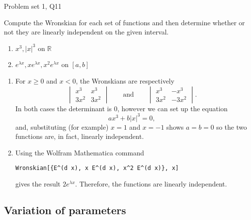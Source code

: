 \begin{problem}{Problem set 1, Q11}{}


    Compute the Wronskian for each set of functions and then determine whether or not they are linearly independent on the given interval.

    \begin{enumerate}
        \item $x^3, \lvert x \rvert^3$ on $\mathbb{R}$
        \item $e^{\lambda x}, xe^{\lambda x}, x^2 e^{\lambda x}$ on $[a, b]$
    \end{enumerate}

    \tcblower

    \begin{enumerate}
        \item For $x \geq 0$ and $x < 0$, the Wronskians are respectively
            $$ 
                \begin{vmatrix}
                    x^3 & x^3 \\
                    3x^2 & 3x^2
                \end{vmatrix}
                \qquad \text{and} \qquad
                \begin{vmatrix}
                    x^3 & -x^3 \\
                    3x^2 & -3x^2
                \end{vmatrix} .
            $$
        In both cases the determinant is $0$, however we can set up the equation
            $$ ax^3 + b \lvert x \rvert^3 = 0 , $$
        and, substituting (for example) $x = 1$ and $x = -1$ shows $a = b = 0$ so the two functions are, in fact, linearly independent.
        \item Using the Wolfram Mathematica command
            \begin{center}
                \lstinline|Wronskian[{E^(d x), x E^(d x), x^2 E^(d x)}, x]|
            \end{center}
        gives the result $2 e^{\lambda x}$. Therefore, the functions are linearly independent.
    \end{enumerate}

\end{problem}

\subsection{Variation of parameters}

